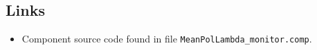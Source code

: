\subsection*{Links}
\begin{itemize}
  \item Component source code found in file \texttt{MeanPolLambda\_monitor.comp}.
\end{itemize}
